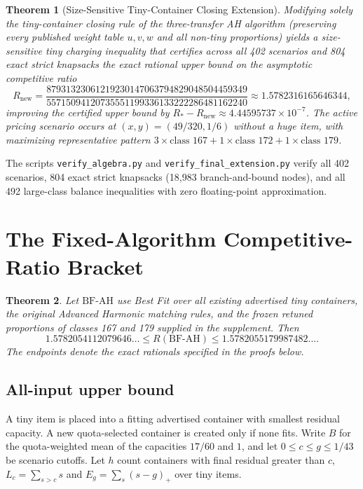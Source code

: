 \documentclass[11pt,letterpaper]{article}
\newtheorem{theorem}{Theorem}[section]
\theoremstyle{definition}
\theoremstyle{remark}
\begin{document}
\begin{theorem}[Size-Sensitive Tiny-Container Closing Extension]\label{thm:rnew}
Modifying solely the tiny-container closing rule of the three-transfer AH algorithm (preserving every published weight table $u,v,w$ and all non-tiny proportions) yields a size-sensitive tiny charging inequality that certifies across all 402 scenarios and 804 exact strict knapsacks the exact rational upper bound on the asymptotic competitive ratio
\begin{equation}\label{eq:rnew}
  R_{\mathrm{new}} = \frac{87931323061219230147063794829048504459349}{55715094120735551199336133222286481162240} \approx 1.5782316165646344,
\end{equation}
improving the certified upper bound by $R_* - R_{\mathrm{new}} \approx 4.44595737 \times 10^{-7}$. The active pricing scenario occurs at $(x,y)=(49/320, 1/6)$ without a huge item, with maximizing representative pattern $3\times \text{class } 167 + 1\times \text{class } 172 + 1\times \text{class } 179$.
\end{theorem}

The scripts \texttt{verify\_algebra.py} and \texttt{verify\_final\_extension.py} verify all 402 scenarios, 804 exact strict knapsacks (18,983 branch-and-bound nodes), and all 492 large-class balance inequalities with zero floating-point approximation.

\section{The Fixed-Algorithm Competitive-Ratio Bracket}\label{sec:phase7}
\begin{theorem}
Let $\mathrm{BF\text{-}AH}$ use Best Fit over all existing advertised tiny containers, the original Advanced Harmonic matching rules, and the frozen retuned proportions of classes 167 and 179 supplied in the supplement. Then
\begin{equation}\label{eq:phase7-bracket}
  1.5782054112079646\dots \le R(\mathrm{BF\text{-}AH}) \le 1.5782055179987482\dots .
\end{equation}
The endpoints denote the exact rationals specified in the proofs below.
\end{theorem}

\subsection{All-input upper bound}
A tiny item is placed into a fitting advertised container with smallest residual capacity. A new quota-selected container is created only if none fits. Write $B$ for the quota-weighted mean of the capacities $17/60$ and $1$, and let $0\le c\le g\le 1/43$ be scenario cutoffs. Let $h$ count containers with final residual greater than $c$, $L_c=\sum_{s>c}s$ and $E_g=\sum_s(s-g)_+$ over tiny items.
\end{document}
